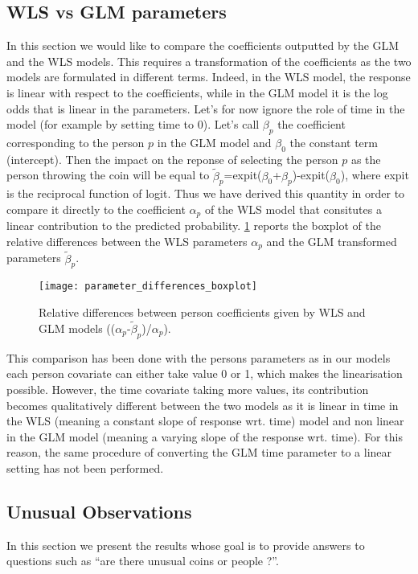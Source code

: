 \documentclass[a4paper, 12pt,oneside]{article}
\begin{document}
		\subsection{WLS vs GLM parameters}
			In this section we would like to compare the coefficients outputted by the GLM and the WLS models. This requires a transformation of the coefficients as the two models are formulated in different terms. Indeed, in the WLS model, the response is linear with respect to the coefficients, while in the GLM model it is the log odds that is linear in the parameters. Let's for now ignore the role of time in the model (for example by setting time to 0). Let's call $\beta_{p}$ the coefficient corresponding to the person $p$ in the GLM model and $\beta_{0}$ the constant term (intercept). Then the impact on the reponse of selecting the person $p$ as the person throwing the coin will be equal to $\tilde{\beta}_{p}$=expit($\beta_{0}$+$\beta_{p}$)-expit($\beta_{0}$), where expit is the reciprocal function of logit. Thus we have derived this quantity in order to compare it directly to the coefficient $\alpha_{p}$ of the WLS model that consitutes a linear contribution to the predicted probability. \ref{fig:parameter_differences_boxplot} reports the boxplot of the relative differences between the WLS parameters $\alpha_{p}$ and the GLM transformed parameters $\tilde{\beta}_{p}$. 
			\begin{figure}[htb]
				\centering
				\texttt{[image: parameter\_differences\_boxplot]}
				\caption{Relative differences between person coefficients given by WLS and GLM models (($\alpha_{p}$-$\tilde{\beta}_{p}$)/$\alpha_{p}$).}
				\label{fig:parameter_differences_boxplot}
			\end{figure}

			This comparison has been done with the persons parameters as in our models each person covariate can either take value 0 or 1, which makes the linearisation possible. However, the time covariate taking more values, its contribution becomes qualitatively different between the two models as it is linear in time in the WLS (meaning a constant slope of response wrt. time) model and non linear in the GLM model (meaning a varying slope of the response wrt. time). For this reason, the same procedure of converting the GLM time parameter to a linear setting has not been performed. 
		\subsection{Unusual Observations}
			In this section we present the results whose goal is to provide answers to questions such as ``are there unusual coins or people ?''. 
\end{document}

